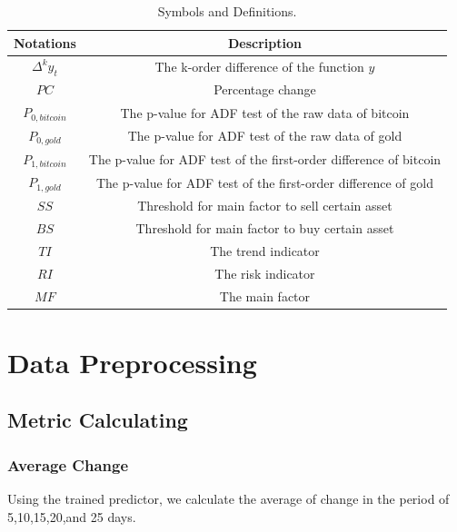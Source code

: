 \documentclass[12pt,a4paper]{article}
\begin{document}
\begin{spacing}{1.2}
\begin{table}[H]
	\renewcommand{\arraystretch}{1.5}
	\caption{Symbols and Definitions.}
	\label{Table_Symbols}
	\begin{center}
		{\footnotesize
			\begin{tabular}{c c}
				\toprule
				{Notations} & {Description} \\
				\midrule
				{$\Delta^ky_t$} & {The k-order difference of the function $y$} \\
				{$PC$}    & {Percentage change} \\ 
				{$P_{0,bitcoin}$}     & { The p-value for ADF test of the raw data of bitcoin} \\ 
				$P_{0,gold}$   & {The p-value for ADF test of the raw data of gold} \\ 
				$P_{1,bitcoin}$     & { The p-value for ADF test of the first-order difference of bitcoin} \\
				$P_{1,gold}$     & {The p-value for ADF test of the first-order difference of gold} \\ 
				$SS$     & {Threshold for main factor to sell certain asset} \\ 
				$BS$    & {Threshold for main factor to buy certain asset} \\ 
				$TI$     & {The trend indicator} \\ 
				$RI$     & {The risk indicator} \\ 
				$MF$     & {The main factor} \\ 
				\bottomrule
		\end{tabular}}
	\end{center}
\end{table}





\section{Data Preprocessing}
\label{DataPreprocessing}


\subsection{Metric Calculating}

\subsubsection{Average Change}

Using the trained predictor, we calculate the average of change in the period of 5,10,15,20,and 25 days.


\end{spacing}
\end{document}

